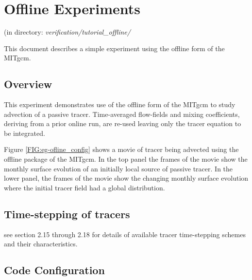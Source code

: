 % 

\section[Offline Example]{Offline Experiments}
\label{www:tutorials}
\label{sect:eg-offline}
\begin{center}
(in directory: {\it verification/tutorial\_offline/}\\
\end{center}

%
%

This document describes a simple experiment using the offline form of
the MITgcm.

\subsection{Overview}
\label{www:tutorials}

This experiment demonstrates use of the offline form of the MITgcm to
study advection of a passive tracer. Time-averaged flow-fields and
mixing coefficients, deriving from a prior online run, are re-used
leaving only the tracer equation to be integrated.

Figure \ref{FIG:eg-ofline_config} shows a movie of tracer being
advected using the offline package of the MITgcm. In the top panel the
frames of the movie show the monthly surface evolution of an initially
local source of passive tracer. In the lower panel, the frames of the
movie show the changing monthly surface evolution where the initial
tracer field had a global distribution.

\subsection{Time-stepping of tracers}
\label{www:tutorials}

\noindent see section 2.15 through 2.18 for details of available
tracer time-stepping schemes and their characteristics.

\subsection{Code Configuration}
\label{www:tutorials}
\label{SEC:eg_fourl_code_config}


